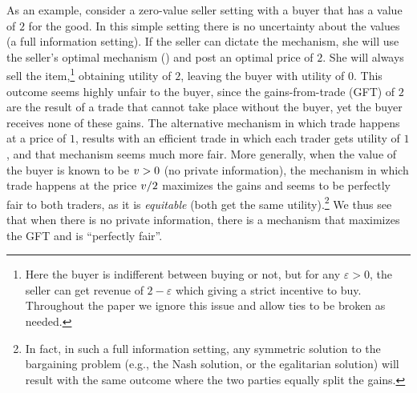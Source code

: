 As an example, consider a zero-value seller setting with a buyer that has a value of $2$ for the good. In this simple setting there is no uncertainty about the values (a full information setting). If the seller can dictate the mechanism, she will use the seller's optimal mechanism ({\SellerOffer}) and post an optimal price of $2$. She will always sell the item,\footnote{Here the buyer is indifferent between buying or not, but for any $\varepsilon>0$, the seller can get revenue of $2-\varepsilon$ which giving a strict incentive to buy. Throughout the paper we ignore this issue and allow ties to be broken as needed.} obtaining utility of $2$, leaving the buyer with utility of $0$. This outcome seems highly unfair to the buyer, since the gains-from-trade (GFT) of $2$ are the result of a trade that cannot take place without the buyer, yet the buyer receives none of these gains. The alternative mechanism in which trade happens at a price of $1$, results with an efficient trade in which each trader gets utility of $1$, and that mechanism seems much more fair. More generally, when the value of the buyer is known to be $v > 0$ (no private information), the mechanism in which trade happens at the price $v/2$ maximizes the gains and seems to be perfectly fair to both traders, as it is \emph{equitable} (both get the same utility).\footnote{In fact, in such a full information setting, any symmetric solution to the bargaining problem (e.g., the Nash solution, or the egalitarian solution) will result with the same outcome where the two parties equally split the gains.} We thus see that when there is no private information, there is a mechanism that maximizes the GFT and is ``perfectly fair''.  

